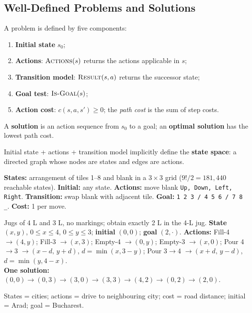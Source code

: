 \subsection{Well-Defined Problems and Solutions}
\begin{definition}
A problem is defined by five components:
\begin{enumerate}
\item \textbf{Initial state} $s_0$;
\item \textbf{Actions}: $\textsc{Actions}(s)$ returns the actions applicable in $s$;
\item \textbf{Transition model}: $\textsc{Result}(s,a)$ returns the successor state;
\item \textbf{Goal test}: $\textsc{Is-Goal}(s)$;
\item \textbf{Action cost}: $c(s,a,s')\ge 0$; the \emph{path cost} is the sum of step costs.
\end{enumerate}
A \textbf{solution} is an action sequence from $s_0$ to a goal; an \textbf{optimal solution} has the lowest path cost.
\end{definition}
Initial state + actions + transition model implicitly define the \textbf{state space}: a directed graph whose nodes are states and edges are actions.

\begin{example}
\textbf{States:} arrangement of tiles 1--8 and blank in a $3\times3$ grid ($9!/2 = 181{,}440$ reachable states).
\textbf{Initial:} any state. \textbf{Actions:} move blank \texttt{Up, Down, Left, Right}. \textbf{Transition:} swap blank with adjacent tile. \textbf{Goal:} \texttt{1 2 3 / 4 5 6 / 7 8 \_}. \textbf{Cost:} 1 per move.
\end{example}

\begin{example}
Jugs of 4 L and 3 L, no markings; obtain exactly 2 L in the 4-L jug.
\textbf{State} $(x,y)$, $0\le x\le4$, $0\le y\le3$; \textbf{initial} $(0,0)$; \textbf{goal} $(2,\cdot)$.
\textbf{Actions:} Fill-4 $\to(4,y)$; Fill-3 $\to(x,3)$; Empty-4 $\to(0,y)$; Empty-3 $\to(x,0)$;
Pour 4$\to$3 $\to(x-d,\,y+d)$, $d=\min(x,3-y)$; Pour 3$\to$4 $\to(x+d,\,y-d)$, $d=\min(y,4-x)$.\\
\textbf{One solution:} $(0,0)\!\to\!(0,3)\!\to\!(3,0)\!\to\!(3,3)\!\to\!(4,2)\!\to\!(0,2)\!\to\!(2,0)$.
\end{example}

\begin{example}
States = cities; actions = drive to neighbouring city; cost = road distance; initial = Arad; goal = Bucharest.
\end{example}


